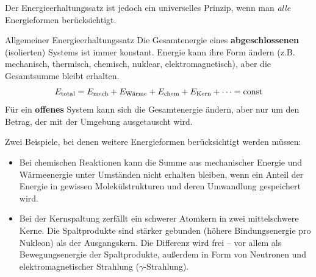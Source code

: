 Der Energieerhaltungssatz ist jedoch ein universelles Prinzip, wenn man \textit{alle} Energieformen berücksichtigt.
\begin{importantbox}{Allgemeiner Energieerhaltungssatz}
    Die Gesamtenergie eines \textbf{abgeschlossenen} (isolierten) Systems ist immer konstant. Energie kann ihre Form ändern (z.B. mechanisch, thermisch, chemisch, nuklear, elektromagnetisch), aber die Gesamtsumme bleibt erhalten. 
    \begin{equation}
        E_{\text{total}} = E_{\text{mech}} + E_{\text{Wärme}} + E_{\text{chem}} + E_{\text{Kern}} + \cdots = \mathrm{const}
    \end{equation}
    Für ein \textbf{offenes} System kann sich die Gesamtenergie ändern, aber nur um den Betrag, der mit der Umgebung ausgetauscht wird. 
\end{importantbox}
Zwei Beispiele, bei denen weitere Energieformen berücksichtigt werden müssen: 
\begin{itemize}
    \item Bei chemischen Reaktionen kann die Summe aus mechanischer Energie und Wärmeenergie unter Umständen nicht erhalten bleiben, wenn ein Anteil der Energie in gewissen Molekülstrukturen und deren Umwandlung gespeichert wird. 
    \item Bei der Kernspaltung zerfällt ein schwerer Atomkern in zwei mittelschwere Kerne. Die Spaltprodukte sind stärker gebunden (höhere Bindungsenergie pro Nukleon) als der Ausgangskern. Die Differenz wird frei -- vor allem als Bewegungsenergie der Spaltprodukte, außerdem in Form von Neutronen und elektromagnetischer Strahlung ($\gamma$-Strahlung). 
\end{itemize}

\newpage
